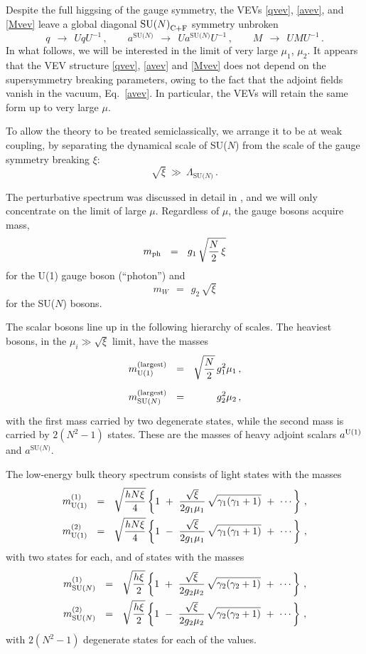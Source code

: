 \documentclass[12pt]{article}
\def\beq{\begin{equation}}
\def\eeq{\end{equation}}
\newcommand{\LN}{\Lambda_\text{SU($N$)}}
\def\cfl {$\text{SU($N$)}_{\rm C+F}$ }
\newcommand{\aU}{a^{\rm U(1)}}
\newcommand{\aN}{a^\text{SU($N$)}}
\begin{document}
	Despite the full higgsing of the gauge symmetry, the VEVs \eqref{qvev},
	\eqref{avev}, and \eqref{Mvev} leave a global diagonal \cfl symmetry unbroken
\beq
\label{c+f}
	q ~~\to~~ UqU^{-1}\,, \qquad \aN ~~\to~~ U \aN U^{-1}\,, \qquad
		M ~~\to~~ UMU^{-1}\,.
\eeq
	In what follows, we will be interested in the limit of very large $ \mu_1 $, $ \mu_2 $.
	It appears that the VEV structure \eqref{qvev}, \eqref{avev} and \eqref{Mvev} does not
	depend on the supersymmetry breaking parameters, owing to the fact that 
	the adjoint fields vanish in the vacuum, Eq.~\eqref{avev}.
	In particular, the VEVs will retain the same form up to very large $ \mu $. 

	To allow the theory to be treated semiclassically, we arrange it to be at weak
	coupling, by separating the dynamical scale of SU($N$) from the scale of the gauge
	symmetry breaking $ \xi $:
\[
 \sqrt{\xi} ~\gg~ \LN \,.
\]

	The perturbative spectrum was discussed in detail in \cite{GSYmmodel}, and we will only
	concentrate on the limit of large $ \mu $. 
	Regardless of $ \mu $, the gauge bosons acquire mass,
\beq
\label{phmass}
	m_{\rm ph} ~~=~~ g_1\, \sqrt{\frac{N}{2}\,\xi}
\eeq
	for the U(1) gauge boson (``photon'') and
\beq
\label{wmass}
	m_W ~~=~~ g_2\, \sqrt{\xi}
\eeq
	for the SU($N$) bosons.

	The scalar bosons line up in the following hierarchy of scales.
	The heaviest bosons, in the $ \mu_i \gg \sqrt{\xi} $ limit, have the masses
\begin{align}
\label{amass}
%
\notag
	m_{\rm U(1)}^{\rm(largest)} & ~~=~~ \sqrt{\frac{N}{2}}\, g_1^2\mu_1 \,, \\
%
	m_\text{SU($N$)}^{\rm(largest)} & ~~=~~ \phantom{\sqrt{\frac{N}{2}}\, }
						g_2^2\mu_2\,,
\end{align}
	with the first mass carried by two degenerate states, while
	the second mass is carried by $ 2 (N^2 - 1) $ states.
	These are the masses of heavy adjoint scalars $ \aU $ and $ \aN $.

	The low-energy bulk theory spectrum consists of light states with the masses
\begin{align}
\label{U1mass}
%
\notag
	m_\text{U(1)}^{(1)}  ~~=~~ \sqrt{\frac{h N\xi}{4}}
		\left\{  1 ~+~ \frac{\sqrt{\xi}}{2g_1\mu_1}\,\sqrt{\gamma_1 (\gamma_1 + 1)} 
				~+~ \cdots \right\}\,,	
	\\
%
	m_\text{U(1)}^{(2)}  ~~=~~ \sqrt{\frac{h N\xi}{4}}
		\left\{  1 ~-~ \frac{\sqrt{\xi}}{2g_1\mu_1}\,\sqrt{\gamma_1 (\gamma_1 + 1)}
				~+~ \cdots \right\}\,,
\end{align}
	with two states for each, and of states with the masses
\begin{align}
\label{SUNmass}
%
\notag
	m_\text{SU($N$)}^{(1)} ~~=~~ \sqrt{\frac{h\xi}{2}}
		\left\{ 1 ~+~ \frac{\sqrt{\xi}}{2 g_2\mu_2}\,\sqrt{\gamma_2 (\gamma_2 + 1)}
				~+~ \cdots \right\}\,,
	\\
%
	m_\text{SU($N$)}^{(2)} ~~=~~ \sqrt{\frac{h\xi}{2}}
		\left\{ 1 ~-~ \frac{\sqrt{\xi}}{2 g_2\mu_2}\,\sqrt{\gamma_2 (\gamma_2 + 1)}
				~+~ \cdots \right\}\,,
\end{align}
	with $ 2 (N^2 - 1) $ degenerate states for each of the values.
\end{document}
